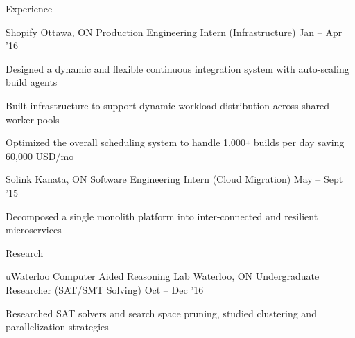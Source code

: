 \documentclass{resume} %
\begin{document}
\begin{rSection}{Experience}
  \begin{rSubsection}{Shopify}
                     {Ottawa, ON}
                     {Production Engineering Intern (Infrastructure)}
                     {Jan -- Apr '16}

  \item Designed a dynamic and flexible continuous integration system with
    auto-scaling build agents
  \item Built infrastructure to support dynamic workload distribution across
    shared worker pools
  \item Optimized the overall scheduling system to handle 1,000\texttt{+} builds per
    day saving 60,000 USD/mo
  \end{rSubsection}

  \begin{rSubsection}{Solink}
                     {Kanata, ON}
                     {Software Engineering Intern (Cloud Migration)}
                     {May -- Sept '15}

   \item Decomposed a single monolith platform into inter-connected and
      resilient microservices
  \end{rSubsection}
\end{rSection}


\begin{rSection}{Research}
  \begin{rSubsection}{uWaterloo Computer Aided Reasoning Lab}
                     {Waterloo, ON}
                     {Undergraduate Researcher (SAT/SMT Solving)}
                     {Oct -- Dec '16}
   \item Researched SAT solvers and search space pruning, studied clustering and
     parallelization strategies
  \end{rSubsection}
\end{rSection}

\end{document}
